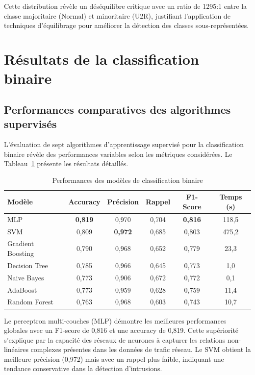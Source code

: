 Cette distribution révèle un déséquilibre critique avec un ratio de 1295:1 entre la classe majoritaire (Normal) et minoritaire (U2R), justifiant l'application de techniques d'équilibrage pour améliorer la détection des classes sous-représentées.

\section{Résultats de la classification binaire}

\subsection{Performances comparatives des algorithmes supervisés}

L'évaluation de sept algorithmes d'apprentissage supervisé pour la classification binaire révèle des performances variables selon les métriques considérées. Le Tableau~\ref{tab:binary_results} présente les résultats détaillés.

\begin{table}[H]
    \centering
    \caption{Performances des modèles de classification binaire}
    \small
    \begin{tabular}{|l|c|c|c|c|c|}
        \hline
        \textbf{Modèle} & \textbf{Accuracy} & \textbf{Précision} & \textbf{Rappel} & \textbf{F1-Score} & \textbf{Temps (s)} \\
        \hline
        MLP & \textbf{0,819} & 0,970 & 0,704 & \textbf{0,816} & 118,5 \\
        SVM & 0,809 & \textbf{0,972} & 0,685 & 0,803 & 475,2 \\
        Gradient Boosting & 0,790 & 0,968 & 0,652 & 0,779 & 23,3 \\
        Decision Tree & 0,785 & 0,966 & 0,645 & 0,773 & 1,0 \\
        Naive Bayes & 0,773 & 0,906 & 0,672 & 0,772 & 0,1 \\
        AdaBoost & 0,773 & 0,959 & 0,628 & 0,759 & 11,4 \\
        Random Forest & 0,763 & 0,968 & 0,603 & 0,743 & 10,7 \\
        \hline
    \end{tabular}
    \label{tab:binary_results}
\end{table}

Le perceptron multi-couches (MLP) démontre les meilleures performances globales avec un F1-score de 0,816 et une accuracy de 0,819. Cette supériorité s'explique par la capacité des réseaux de neurones à capturer les relations non-linéaires complexes présentes dans les données de trafic réseau. Le SVM obtient la meilleure précision (0,972) mais avec un rappel plus faible, indiquant une tendance conservative dans la détection d'intrusions.

